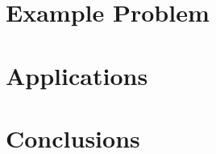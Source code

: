 \documentclass[]{aiaa-tc} %
\begin{document}
    


    
\section{Example Problem}

\section{Applications}

\section{Conclusions}


\end{document}

